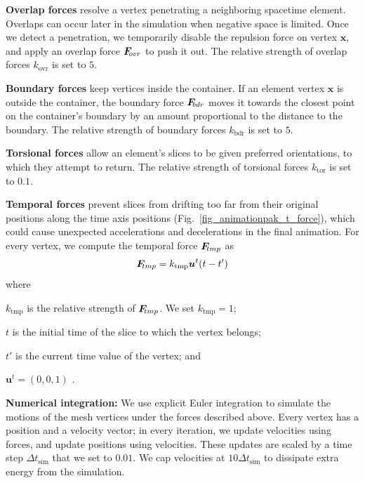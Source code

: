 \newtext
{
\textbf{Overlap forces} resolve a vertex penetrating a
neighboring spacetime element.
Overlaps can occur later in the simulation when negative space is 
limited.  Once we detect a penetration,  
we temporarily disable the repulsion force on vertex $\bm{x}$, and apply
an overlap force $\simforce{ovr}$ to push it out.
The relative strength of overlap forces $k_\mathrm{ovr}$ is set to $5$.
}

\newtext
{
\textbf{Boundary forces} keep vertices inside the container.
If an element vertex $\bm{x}$
is outside the container, the boundary force $\simforce{bdr}$ moves
it towards the closest point
on the container's boundary by an amount proportional to the distance to
the boundary.
The relative strength of boundary forces $k_\mathrm{bdr}$ is set to $5$.
}

\newtext
{
\textbf{Torsional forces} allow an element's slices to be given
preferred orientations, to which they attempt to return.
The relative strength of torsional forces $k_\mathrm{tor}$ is set to $0.1$.
}

\newtext
{
\textbf{Temporal forces} prevent slices from drifting too far
from their original positions along the time axis positions
(Fig.~\ref{fig_animationpak_t_force}), which could cause unexpected accelerations
and decelerations in the final animation.  For every vertex, we compute
the temporal force $\simforce{tmp}$ as
\begin{equation}
\simforce{tmp} = k_\mathrm{tmp} \bm{u}^t(t - t')
\end{equation}
where
\begin{packeddescriptions}
  \item[$k_\mathrm{tmp}$] is the relative strength of 
    $\simforce{tmp}$. We set $k_\mathrm{tmp} = 1$;
  \item[$t$] is the initial time of the slice to which the vertex belongs;
  \item[$t'$] is the current time value of the vertex; and
  \item[$\bm{u}^t = (0,0,1)$].
\end{packeddescriptions}
}

\newtext
{
\textbf{Numerical integration:}
We use explicit Euler integration to simulate the motions of the mesh vertices under the
forces described above.  Every vertex has a position and a velocity vector; in
every iteration, we update velocities using forces, and update positions using
velocities.  These updates are scaled by a time step 
$\Delta t_\mathrm{sim}$ that we set to $0.01$.
We cap velocities at $10 \Delta t_\mathrm{sim}$ 
to dissipate extra energy from the simulation.
}

